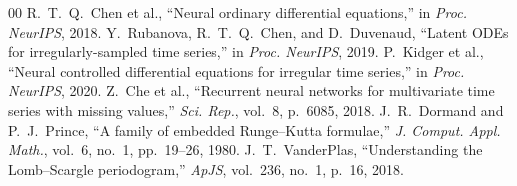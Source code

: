 \documentclass[11pt]{article}
\begin{document}
\begin{thebibliography}{00}
 R.~T.~Q.~Chen et al., ``Neural ordinary differential equations,'' in \textit{Proc. NeurIPS}, 2018.
 Y.~Rubanova, R.~T.~Q.~Chen, and D.~Duvenaud, ``Latent ODEs for irregularly-sampled time series,'' in \textit{Proc. NeurIPS}, 2019.
 P.~Kidger et al., ``Neural controlled differential equations for irregular time series,'' in \textit{Proc. NeurIPS}, 2020.
 Z.~Che et al., ``Recurrent neural networks for multivariate time series with missing values,'' \textit{Sci. Rep.}, vol.~8, p.~6085, 2018.
 J.~R.~Dormand and P.~J.~Prince, ``A family of embedded Runge--Kutta formulae,'' \textit{J. Comput. Appl. Math.}, vol.~6, no.~1, pp.~19--26, 1980.
 J.~T.~VanderPlas, ``Understanding the Lomb--Scargle periodogram,'' \textit{ApJS}, vol.~236, no.~1, p.~16, 2018.
\end{thebibliography}
\end{document}
